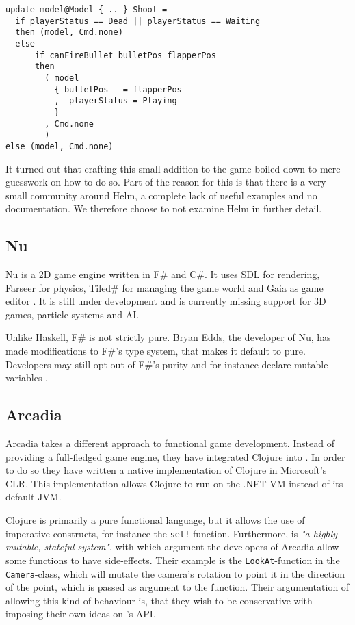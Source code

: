 \begin{lstlisting}[style=haskell-highlight,label={lst:haskell:shoot},caption={Haskell Shoot}]
update model@Model { .. } Shoot =
  if playerStatus == Dead || playerStatus == Waiting
  then (model, Cmd.none)
  else
      if canFireBullet bulletPos flapperPos
      then
        ( model
          { bulletPos   = flapperPos 
          ,  playerStatus = Playing
          }
        , Cmd.none
        )
else (model, Cmd.none)
\end{lstlisting}

It turned out that crafting this small addition to the game boiled down to mere guesswork on how to do so. Part of the reason for this is that there is a very small community around Helm, a complete lack of useful examples and no documentation. We therefore choose to not examine Helm in further detail.

\subsection{Nu}
Nu is a 2D game engine written in F\# and C\#. It uses \ac{SDL} for rendering, Farseer for physics, Tiled\# for managing the game world and Gaia as game editor \cite{nu:github}. It is still under development and is currently missing support for 3D games, particle systems and AI.

Unlike Haskell, F\# is not strictly pure. Bryan Edds, the developer of Nu, has made modifications to F\#'s type system, that makes it default to pure. Developers may still opt out of F\#'s purity and for instance declare mutable variables \cite{nu:pdf}. 

\subsection{Arcadia}
Arcadia takes a different approach to functional game development. Instead of providing a full-fledged game engine, they have integrated Clojure into \unityspace\cite{arcadia:github,arcadia:usage}. In order to do so they have written a native implementation of Clojure in Microsoft's \ac{CLR}\cite{arcadia:clr}. This implementation allows Clojure to run on the .NET \ac{VM} instead of its default \ac{JVM}.

Clojure is primarily a pure functional language, but it allows the use of imperative constructs, for instance the \texttt{set!}-function\cite{arcadia:usage}. Furthermore, \unityspace is \textit{"a highly mutable, stateful system"}, with which argument the developers of Arcadia allow some functions to have side-effects. Their example is the \texttt{LookAt}-function in the \texttt{Camera}-class, which will mutate the camera's rotation to point it in the direction of the point, which is passed as argument to the function. Their argumentation of allowing this kind of behaviour is, that they wish to be conservative with imposing their own ideas on \unity's \ac{API}.

